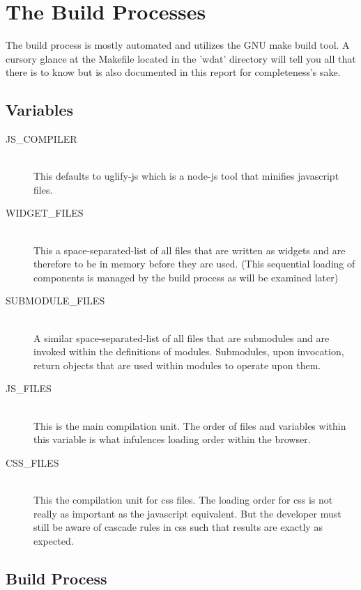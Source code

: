 \chapter{The Build Processes}

The build process is mostly automated and utilizes the GNU make build
tool. A cursory glance at the Makefile located in the 'wdat' directory
will tell you all that there is to know but is also documented in this
report for completeness's sake.

\section{Variables}

\begin{description}

  \item[JS\_COMPILER] \hfill \\
  This defaults to uglify-js which is a node-js tool that minifies javascript files.

  \item[WIDGET\_FILES] \hfill \\ 
  This a space-separated-list of all files that are written as widgets
  and are therefore to be in memory before they are used.  (This
  sequential loading of components is managed by the build process
  as will be examined later)

  \item[SUBMODULE\_FILES] \hfill \\
  A similar space-separated-list of all files that are submodules and
  are invoked within the definitions of modules.  Submodules, upon
  invocation, return objects that are used within modules to operate
  upon them. 

  \item[JS\_FILES] \hfill \\
  This is the main compilation unit.  The order of files and variables
  within this variable is what infulences loading order within the
  browser.

  \item[CSS\_FILES] \hfill \\
  This the compilation unit for css files. The loading order for css
  is not really as important as the javascript equivalent. But the
  developer must still be aware of cascade rules in css such that
  results are exactly as expected.
\end{description}


\section{Build Process}


